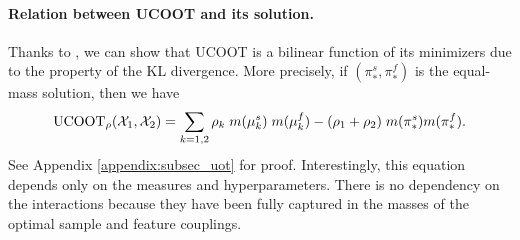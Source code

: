 \paragraph{Relation between UCOOT and its solution.}
Thanks to , we can show that UCOOT is a bilinear function of its minimizers
due to the property of the KL divergence. More precisely,
if $(\pi_*^s, \pi_*^f)$ is the equal-mass solution, then we have
\begin{align}
  \label{eq:ucoot_minimizer_minimum}
  \text{UCOOT}_{\rho}(\mathcal X_1, \mathcal X_2) =
  \sum_{k=1, 2} \rho_k \; m(\mu_k^s) \; m(\mu_k^f) - (\rho_1  + \rho_2) \; m(\pi^s_*) m(\pi^f_*).
\end{align}
See Appendix \ref{appendix:subsec_uot} for proof.
Interestingly, this equation depends only on the measures and hyperparameters. There is no
dependency on the interactions because they have been fully captured in the masses of
the optimal sample and feature couplings.

